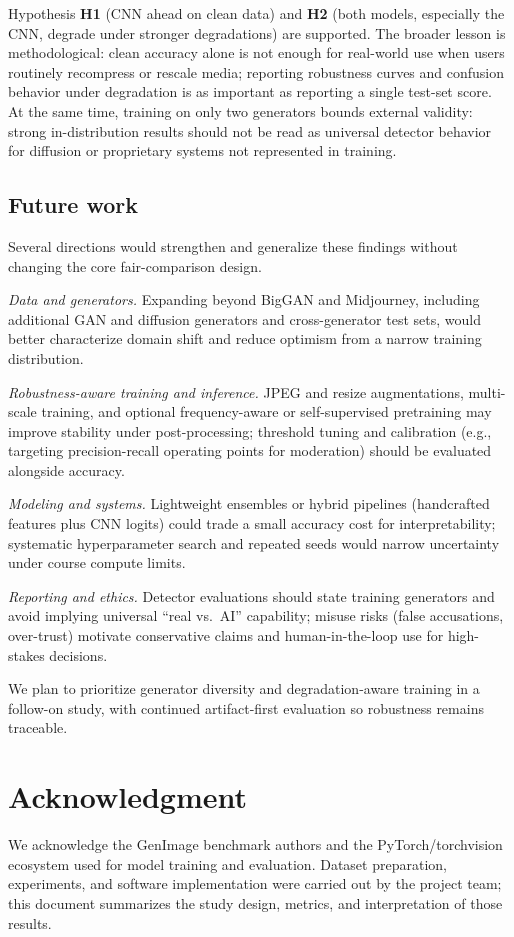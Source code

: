 \documentclass[conference]{IEEEtran}
\begin{document}
Hypothesis \textbf{H1} (CNN ahead on clean data) and \textbf{H2} (both models, especially the CNN, degrade under stronger degradations) are supported. The broader lesson is methodological: clean accuracy alone is not enough for real-world use when users routinely recompress or rescale media; reporting robustness curves and confusion behavior under degradation is as important as reporting a single test-set score. At the same time, training on only two generators bounds external validity: strong in-distribution results should not be read as universal detector behavior for diffusion or proprietary systems not represented in training.

\subsection{Future work}
Several directions would strengthen and generalize these findings without changing the core fair-comparison design.

\textit{Data and generators.} Expanding beyond BigGAN and Midjourney, including additional GAN and diffusion generators and cross-generator test sets, would better characterize domain shift and reduce optimism from a narrow training distribution.

\textit{Robustness-aware training and inference.} JPEG and resize augmentations, multi-scale training, and optional frequency-aware or self-supervised pretraining may improve stability under post-processing; threshold tuning and calibration (e.g., targeting precision-recall operating points for moderation) should be evaluated alongside accuracy.

\textit{Modeling and systems.} Lightweight ensembles or hybrid pipelines (handcrafted features plus CNN logits) could trade a small accuracy cost for interpretability; systematic hyperparameter search and repeated seeds would narrow uncertainty under course compute limits.

\textit{Reporting and ethics.} Detector evaluations should state training generators and avoid implying universal ``real vs.\ AI'' capability; misuse risks (false accusations, over-trust) motivate conservative claims and human-in-the-loop use for high-stakes decisions.

We plan to prioritize generator diversity and degradation-aware training in a follow-on study, with continued artifact-first evaluation so robustness remains traceable.

\section*{Acknowledgment}
We acknowledge the GenImage benchmark authors and the PyTorch/torchvision ecosystem used for model training and evaluation. Dataset preparation, experiments, and software implementation were carried out by the project team; this document summarizes the study design, metrics, and interpretation of those results.

\flushend
\clearpage


\end{document}
